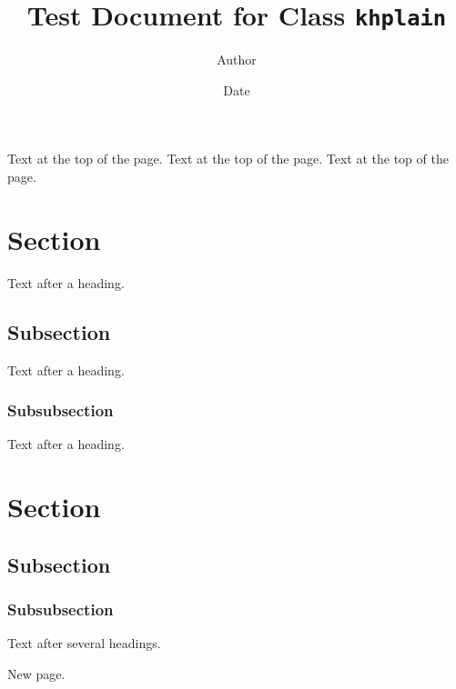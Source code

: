 \documentclass[11pt]{khplain}
\title{Test Document for Class \texttt{khplain}}
\author{Author}
\date{Date}
\begin{document}
\maketitle

Text at the top of the page. Text at the top of the page. Text at the top of the page.

\section{Section}
Text after a heading.

\subsection{Subsection}
Text after a heading.

\subsubsection{Subsubsection}
Text after a heading.

\section{Section}
\subsection{Subsection}
\subsubsection{Subsubsection}
Text after several headings.

\newpage

New page.
\end{document}
